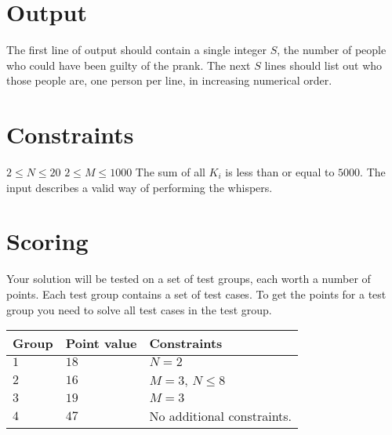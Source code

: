\section*{Output}
The first line of output should contain a single integer $S$, the number of people who could have been guilty of the prank. 
The next $S$ lines should list out who those people are, one person per line, in increasing numerical order.

\section*{Constraints}
$2 \le N \le 20$
\newline
$2 \le M \le 1000$
\newline
The sum of all $K_i$ is less than or equal to $5000$.
\newline
The input describes a valid way of performing the whispers.

\section*{Scoring}
Your solution will be tested on a set of test groups, each worth a number of points. 
Each test group contains a set of test cases. 
To get the points for a test group you need to solve all test cases in the test group.

\noindent
\begin{tabular}{| l | l | p{12cm} |}
  \hline
  \textbf{Group} & \textbf{Point value} & \textbf{Constraints} \\ \hline
  $1$    & $18$       & $N = 2$  \\ \hline
  $2$    & $16$       & $M = 3$, $N \le 8$\\ \hline
  $3$    & $19$       & $M = 3$ \\ \hline
  $4$    & $47$       & No additional constraints. \\ \hline
\end{tabular}

